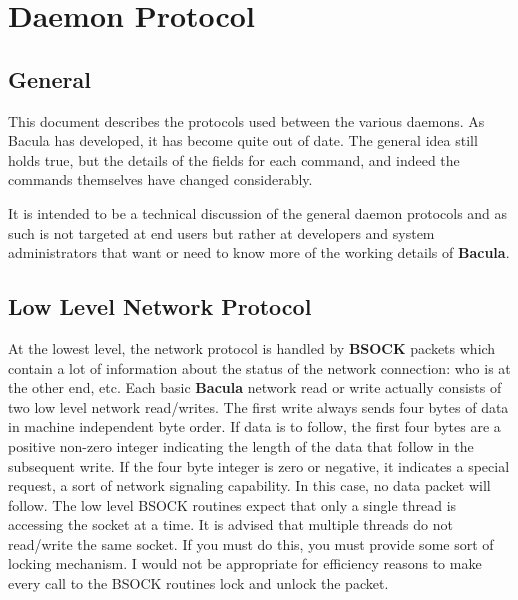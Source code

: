 
\section*{Daemon Protocol}
\label{_ChapterStart2}

\subsection*{General}

This document describes the protocols used between the various daemons. As
Bacula has developed, it has become quite out of date. The general idea still
holds true, but the details of the fields for each command, and indeed the
commands themselves have changed considerably. 

It is intended to be a technical discussion of the general daemon protocols
and as such is not targeted at end users but rather at developers and system
administrators that want or need to know more of the working details of {\bf
Bacula}. 

\subsection*{Low Level Network Protocol}

At the lowest level, the network protocol is handled by {\bf BSOCK} packets
which contain a lot of information about the status of the network connection:
who is at the other end, etc. Each basic {\bf Bacula} network read or write
actually consists of two low level network read/writes. The first write always
sends four bytes of data in machine independent byte order. If data is to
follow, the first four bytes are a positive non-zero integer indicating the
length of the data that follow in the subsequent write. If the four byte
integer is zero or negative, it indicates a special request, a sort of network
signaling capability. In this case, no data packet will follow. The low level
BSOCK routines expect that only a single thread is accessing the socket at a
time. It is advised that multiple threads do not read/write the same socket.
If you must do this, you must provide some sort of locking mechanism. I would
not be appropriate for efficiency reasons to make every call to the BSOCK
routines lock and unlock the packet. 

